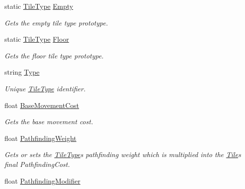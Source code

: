 \begin{DoxyCompactItemize}
\item 
static \hyperlink{class_tile_type}{Tile\+Type} \hyperlink{class_tile_type_a60e6955dc3faf61db0a2fa8426499b92}{Empty}
\begin{DoxyCompactList}\small\item\em Gets the empty tile type prototype. \end{DoxyCompactList}\item 
static \hyperlink{class_tile_type}{Tile\+Type} \hyperlink{class_tile_type_a340e5076e637c0ef7ff1b11ac4cf04fd}{Floor}
\begin{DoxyCompactList}\small\item\em Gets the floor tile type prototype. \end{DoxyCompactList}\item 
string \hyperlink{class_tile_type_ade3d6ab90410efe24493eed09f5a8d21}{Type}
\begin{DoxyCompactList}\small\item\em Unique \hyperlink{class_tile_type}{Tile\+Type} identifier. \end{DoxyCompactList}\item 
float \hyperlink{class_tile_type_a7d008dccbb7ecaf0f12acae8f7989068}{Base\+Movement\+Cost}
\begin{DoxyCompactList}\small\item\em Gets the base movement cost. \end{DoxyCompactList}\item 
float \hyperlink{class_tile_type_a51128d6ebf05eb04f7187ca86b181846}{Pathfinding\+Weight}
\begin{DoxyCompactList}\small\item\em Gets or sets the \hyperlink{class_tile_type}{Tile\+Type}\textquotesingle{}s pathfinding weight which is multiplied into the \hyperlink{class_tile}{Tile}\textquotesingle{}s final Pathfinding\+Cost. \end{DoxyCompactList}\item 
float \hyperlink{class_tile_type_a4325bfa21ffacf67fa1ead7b0394abe7}{Pathfinding\+Modifier}

\end{DoxyCompactItemize}
